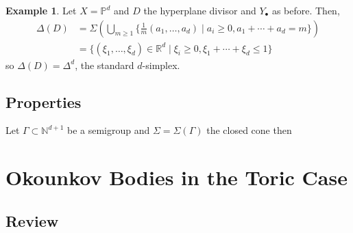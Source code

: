 \documentclass[12pt]{extarticle}
\newcommand{\R}{\mathbb{R}}
\newcommand{\N}{\mathbb{N}}
\theoremstyle{definition}
\newtheorem{example}[theorem]{Example}
\begin{document}
\begin{example}
Let $X = \mathbb{P}^d$ and $D$ the hyperplane divisor and $Y_\bullet$ as before. Then,
\begin{align*}
\Delta(D) & = \Sigma\left( \bigcup_{ m \ge 1} \{ \tfrac{1}{m} (a_1, \dots, a_d) \mid a_i \ge 0, a_1 + \cdots + a_d = m \} \right) 
\\
& = \{ (\xi_1, \dots, \xi_d) \in \R^d \mid \xi_i \ge 0, \xi_1 + \cdots + \xi_d \le 1 \}
\end{align*}
so $\Delta(D) = \Delta^d$, the standard $d$-simplex. 
\end{example}

\subsection{Properties}

Let $\Gamma \subset \N^{d+1}$ be a semigroup and $\Sigma = \Sigma(\Gamma)$ the closed cone then

\section{Okounkov Bodies in the Toric Case}

\subsection{Review}
\end{document}
